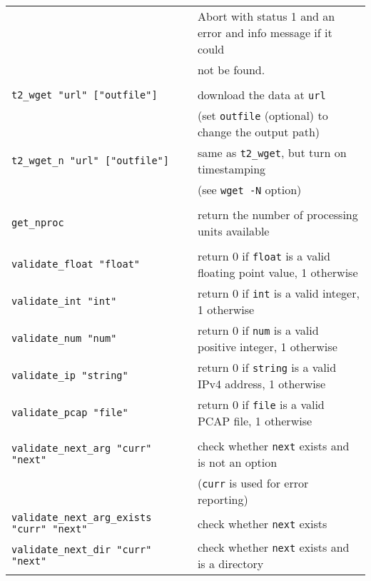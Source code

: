 \documentclass[documentation]{subfiles}
\begin{document}
\begin{longtable}{>{\tt}ll}
                                                & Abort with status 1 and an error and info message if it could\\
                                                & not be found.\\
                                                & \\
    t2\_wget    "url" ["outfile"]               & download the data at {\tt url}\\
                                                & (set {\tt outfile} (optional) to change the output path)\\
    t2\_wget\_n "url" ["outfile"]               & same as {\tt t2\_wget}, but turn on timestamping\\
                                                & (see {\tt wget -N} option)\\
                                                & \\
    get\_nproc                                  & return the number of processing units available\\
                                                & \\
    validate\_float "float"                     & return 0 if {\tt float} is a valid floating point value, 1 otherwise\\
    validate\_int   "int"                       & return 0 if {\tt int} is a valid integer, 1 otherwise\\
    validate\_num   "num"                       & return 0 if {\tt num} is a valid positive integer, 1 otherwise\\
    validate\_ip    "string"                    & return 0 if {\tt string} is a valid IPv4 address, 1 otherwise\\
    validate\_pcap  "file"                      & return 0 if {\tt file} is a valid PCAP file, 1 otherwise\\
                                                & \\
    validate\_next\_arg "curr" "next"           & check whether {\tt next} exists and is not an option\\
                                                & ({\tt curr} is used for error reporting)\\
    validate\_next\_arg\_exists   "curr" "next" & check whether {\tt next} exists\\
    validate\_next\_dir           "curr" "next" & check whether {\tt next} exists and is a directory\\

\end{longtable}
\end{document}

